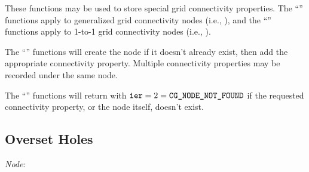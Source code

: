 These functions may be used to store special grid connectivity properties.
The ``'' functions apply to generalized grid
connectivity nodes (i.e., ), and the
``'' functions apply to 1-to-1 grid connectivity nodes
(i.e., ).

The ``'' functions will create the
 node if it doesn't already exist,
then add the appropriate connectivity property.
Multiple connectivity properties may be recorded under the same
 node.

The ``'' functions will return with $\text{{\normalfont\texttt{ier}}} = 2 =
\text{{\normalfont\texttt{CG\_NODE\_NOT\_FOUND}}}$ if the requested connectivity property,
or the  node itself, doesn't exist.

\newpage
\subsection{Overset Holes}
\label{s:overset}

\noindent
\textit{Node}: 

